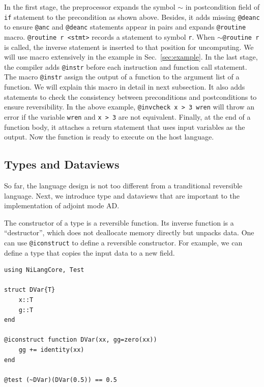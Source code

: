 \documentclass[aps,twocolumn,longbibliography,english,superscriptaddress,prr]{revtex4-1}
\newcommand{\<}{\langle}
\renewcommand{\>}{\rangle}
\newcommand{\Sec}[1]{Sec.~\ref{#1}}
\theoremstyle{definition}\newtheorem{definition}{\textit{Definition}}
\begin{document}
In the first stage, the preprocessor expands the symbol \texttt{$\sim$} in postcondition field of \texttt{if} statement to the precondition as shown above. Besides, it adds missing \texttt{@deanc} to ensure \texttt{@anc} and \texttt{@deanc} statements appear in pairs and  expands \texttt{@routine} macro.
\texttt{@routine r <stmt>} records a statement to symbol \texttt{r}. When \texttt{$\sim$@routine r} is called, the inverse statement is inserted to that position for uncomputing. We will use macro extensively in the example in \Sec{sec:example}.
In the last stage, the compiler adds \texttt{@instr} before each instruction and function call statement.
The macro \texttt{@instr} assign the output of a function to the argument list of a function. We will explain this macro in detail in next subsection.
It also adds statements to check the consistency between preconditions and postconditions to ensure reversibility.
In the above example, \texttt{@invcheck x > 3 wren} will throw an error if the variable \texttt{wren} and \texttt{x > 3} are not equivalent.
Finally, at the end of a function body, it attaches a return statement that uses input variables as the output.
Now the function is ready to execute on the host language.

\subsection{Types and Dataviews}
So far, the language design is not too different from a tranditional reversible language.
Next, we introduce type and dataviews that are important to the implementation of adjoint mode AD.

The constructor of a type is a reversible function.
Its inverse function is a ``destructor'', which does not deallocate memory directly but unpacks data.
One can use \texttt{@iconstruct} to define a reversible constructor.
For example, we can define a type that copies the input data to a new field.

\begin{minipage}{.44\textwidth}
\begin{lstlisting}
using NiLangCore, Test

struct DVar{T}
    x::T
    g::T
end

@iconstruct function DVar(xx, gg=zero(xx))
    gg += identity(xx)
end

@test (~DVar)(DVar(0.5)) == 0.5
\end{lstlisting}
\end{minipage}
\end{document}
